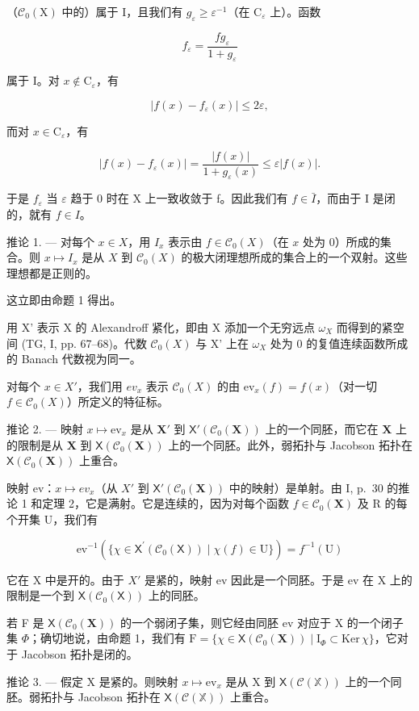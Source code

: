 （\(\mathcal{C}_0(\mathrm{X})\) 中的）属于 I，且我们有 \(g_{\varepsilon} \geqslant \varepsilon^{-1}\)（在 \(\mathrm{C}_{\varepsilon}\) 上）。函数

\[
f _ {\varepsilon} = \frac {f g _ {\varepsilon}}{1 + g _ {\varepsilon}}
\]

属于 I。对 \(x \notin \mathrm{C}_{\varepsilon}\)，有

\[
\left| f (x) - f _ {\varepsilon} (x) \right| \leqslant 2 \varepsilon ,
\]

而对 \(x\in \mathrm{C}_{\varepsilon}\)，有

\[
| f (x) - f _ {\varepsilon} (x) | = \frac {| f (x) |}{1 + g _ {\varepsilon} (x)} \leqslant \varepsilon | f (x) |.
\]

于是 \(f_{\varepsilon}\) 当 \(\varepsilon\) 趋于 0 时在 X 上一致收敛于 f。因此我们有 \(f \in \bar{I}\)，而由于 I 是闭的，就有 \(f \in I\)。

推论 1. --- 对每个 \(x \in X\)，用 \(I_x\) 表示由 \(f \in \mathcal{C}_0(X)\)（在 \(x\) 处为 0）所成的集合。则 \(x \mapsto I_x\) 是从 \(X\) 到 \(\mathcal{C}_0(X)\) 的极大闭理想所成的集合上的一个双射。这些理想都是正则的。

这立即由命题 1 得出。

用 X' 表示 X 的 Alexandroff 紧化，即由 X 添加一个无穷远点 \(\omega_{X}\) 而得到的紧空间 (TG, I, pp. 67–68)。代数 \(\mathcal{C}_{0}(X)\) 与 X' 上在 \(\omega_{X}\) 处为 0 的复值连续函数所成的 Banach 代数视为同一。

对每个 \(x \in X'\)，我们用 \(ev_{x}\) 表示 \(\mathcal{C}_{0}(X)\) 的由 \(\mathrm{ev}_{x}(f) = f(x)\)（对一切 \(f \in \mathcal{C}_{0}(X)\)）所定义的特征标。

推论 2. --- 映射 \(x \mapsto \mathrm{ev}_x\) 是从 \(\mathbf{X}'\) 到 \(\mathsf{X}'(\mathcal{C}_0(\mathbf{X}))\) 上的一个同胚，而它在 \(\mathbf{X}\) 上的限制是从 \(\mathbf{X}\) 到 \(\mathsf{X}(\mathcal{C}_0(\mathbf{X}))\) 上的一个同胚。此外，弱拓扑与 Jacobson 拓扑在 \(\mathsf{X}(\mathcal{C}_0(\mathbf{X}))\) 上重合。

映射 ev：\(x \mapsto ev_{x}\)（从 \(X'\) 到 \(\mathsf{X}'(\mathcal{C}_{0}(\mathbf{X}))\) 中的映射）是单射。由 I, p.~30 的推论 1 和定理 2，它是满射。它是连续的，因为对每个函数 \(f \in \mathcal{C}_{0}(\mathbf{X})\) 及 R 的每个开集 U，我们有

\[
\mathrm{ev} ^ {- 1} (\{\chi \in \mathsf {X} ^ {\prime} (\mathcal {C} _ {0} (\mathsf {X})) \mid \chi (f) \in \mathrm{U} \}) = f ^ {- 1} (\mathrm{U})
\]

它在 X 中是开的。由于 \(X'\) 是紧的，映射 ev 因此是一个同胚。于是 ev 在 X 上的限制是一个到 \(\mathsf{X}(\mathcal{C}_{0}(\mathsf{X}))\) 上的同胚。

若 F 是 \(\mathsf{X}(\mathcal{C}_{0}(\mathbf{X}))\) 的一个弱闭子集，则它经由同胚 ev 对应于 X 的一个闭子集 \(\Phi\)；确切地说，由命题 1，我们有 \(\mathrm{F} = \{\chi \in \mathsf{X}(\mathcal{C}_{0}(\mathbf{X})) \mid \mathrm{I}_{\Phi} \subset \mathrm{Ker} \, \chi\}\)，它对于 Jacobson 拓扑是闭的。

推论 3. --- 假定 X 是紧的。则映射 \(x \mapsto \mathrm{ev}_x\) 是从 X 到 \(\mathsf{X}(\mathcal{C}(\mathbb{X}))\) 上的一个同胚。弱拓扑与 Jacobson 拓扑在 \(\mathsf{X}(\mathcal{C}(\mathbb{X}))\) 上重合。
\relax{}
